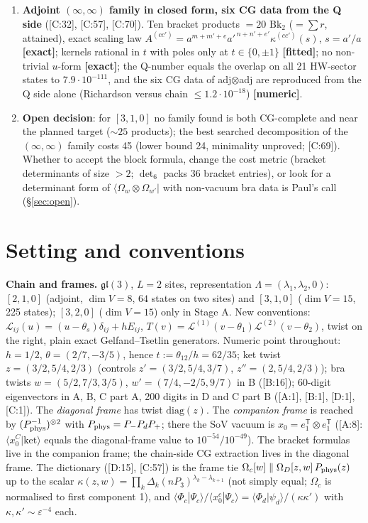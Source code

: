 \documentclass[10pt]{article}
\newcommand{\cl}[2]{\textsf{[#1:#2]}}
\newcommand{\tg}[1]{\textbf{[#1]}}
\newcommand{\Bk}{\mathrm{Bk}_2}
\newcommand{\Om}{\Omega}
\newcommand{\bra}[1]{\langle #1|}
\begin{document}
\begin{enumerate}
\item \textbf{Adjoint $(\infty,\infty)$ family in closed form, six CG data from the Q side} (\cl{C}{32}, \cl{C}{57}, \cl{C}{70}). Ten bracket products $=20$ $\Bk$ ($=\sum r$, attained), exact scaling law $A^{(cc')}=a^{m+m'+e}a'^{\,n+n'+e'}\kappa^{(cc')}(s)$, $s=a'/a$ \tg{exact}; kernels rational in $t$ with poles only at $t\in\{0,\pm1\}$ \tg{fitted}; no non-trivial $u$-form \tg{exact}; the Q-number equals the overlap on all 21 HW-sector states to $7.9\cdot10^{-111}$, and the six CG data of adj$\otimes$adj are reproduced from the Q side alone (Richardson versus chain $\le1.2\cdot10^{-18}$) \tg{numeric}.
\item \textbf{Open decision}: for $[3,1,0]$ no family found is both CG-complete and near the planned target ($\sim25$ products); the best searched decomposition of the $(\infty,\infty)$ family costs 45 (lower bound 24, minimality unproved; \cl{C}{69}). Whether to accept the block formula, change the cost metric (bracket determinants of size $>2$; $\det_6$ packs 36 bracket entries), or look for a determinant form of $\bra{\Om_w\otimes\Om_{w'}}$ with non-vacuum bra data is Paul's call (\S\ref{sec:open}).
\end{enumerate}

\section{Setting and conventions}\label{sec:setting}

\textbf{Chain and frames.} $\mathfrak{gl}(3)$, $L=2$ sites, representation $\Lambda=(\lambda_1,\lambda_2,0)$: $[2,1,0]$ (adjoint, $\dim V=8$, $64$ states on two sites) and $[3,1,0]$ ($\dim V=15$, 225 states); $[3,2,0]$ ($\dim V=15$) only in Stage A. New conventions: $\mathcal L_{ij}(u)=(u-\theta_s)\delta_{ij}+hE_{ij}$, $T(v)=\mathcal L^{(1)}(v-\theta_1)\mathcal L^{(2)}(v-\theta_2)$, twist on the right, plain exact Gelfand--Tsetlin generators. Numeric point throughout: $h=1/2$, $\theta=(2/7,-3/5)$, hence $t:=\theta_{12}/h=62/35$; ket twist $z=(3/2,5/4,2/3)$ (controls $z'=(3/2,5/4,3/7)$, $z''=(2,5/4,2/3)$); bra twists $w=(5/2,7/3,3/5)$, $w'=(7/4,-2/5,9/7)$ in B (\cl{B}{16}); 60-digit eigenvectors in A, B, C part A, 200 digits in D and C part B (\cl{A}{1}, \cl{B}{1}, \cl{D}{1}, \cl{C}{1}).
The \emph{diagonal frame} has twist $\mathrm{diag}(z)$. The \emph{companion frame} is reached by $(P_{\rm phys}^{-1})^{\otimes2}$ with $P_{\rm phys}=P_-P_dP_+$; there the SoV vacuum is $x_0=e_1^{\mathsf T}\otimes e_1^{\mathsf T}$ (\cl{A}{8}: $\langle x_0^C|\mathrm{ket}\rangle$ equals the diagonal-frame value to $10^{-54}/10^{-49}$). The bracket formulas live in the companion frame; the chain-side CG extraction lives in the diagonal frame. The dictionary (\cl{D}{15}, \cl{C}{57}) is the frame tie $\Om_c[w]\parallel \Om_D[z,w]\,P_{\rm phys}(z)$ up to the scalar $\kappa(z,w)=\prod_k\Delta_k(nP_3)^{\lambda_k-\lambda_{k+1}}$ (not simply equal; $\Om_c$ is normalised to first component 1), and $\langle\Phi_c|\Psi_c\rangle/\langle x_0^c|\Psi_c\rangle=\langle\Phi_d|\psi_d\rangle/(\kappa\kappa')$ with $\kappa,\kappa'\sim\varepsilon^{-4}$ each.
\end{document}
